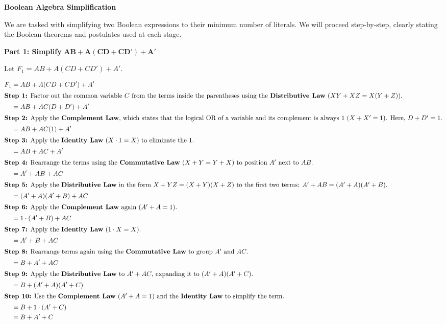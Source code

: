 \documentclass[12pt,a3paper]{article}
\begin{document}
\begin{enumerate}
\begin{tcolorbox}[enhanced,breakable,ansbox,colback=cA!4,colframe=cA,boxrule=0.8pt,arc=5pt,title={\textbf{Answer}},fonttitle=\bfseries\color{white},colbacktitle=cA]

\textbf{Boolean Algebra Simplification}

We are tasked with simplifying two Boolean expressions to their minimum number of literals. We will proceed step-by-step, clearly stating the Boolean theorems and postulates used at each stage.

\vspace{0.4cm}
\textbf{Part 1: Simplify } $\mathbf{AB + A(CD + CD') + A'}$

Let $F_1 = AB + A(CD + CD') + A'$. 

\begin{align*}
F_1 &= AB + A(CD + CD') + A' \\
\intertext{\textbf{Step 1:} Factor out the common variable $C$ from the terms inside the parentheses using the \textbf{Distributive Law} ($XY + XZ = X(Y + Z)$).}
&= AB + AC(D + D') + A' \\
\intertext{\textbf{Step 2:} Apply the \textbf{Complement Law}, which states that the logical OR of a variable and its complement is always $1$ ($X + X' = 1$). Here, $D + D' = 1$.}
&= AB + AC(1) + A' \\
\intertext{\textbf{Step 3:} Apply the \textbf{Identity Law} ($X \cdot 1 = X$) to eliminate the $1$.}
&= AB + AC + A' \\
\intertext{\textbf{Step 4:} Rearrange the terms using the \textbf{Commutative Law} ($X + Y = Y + X$) to position $A'$ next to $AB$.}
&= A' + AB + AC \\
\intertext{\textbf{Step 5:} Apply the \textbf{Distributive Law} in the form $X + YZ = (X + Y)(X + Z)$ to the first two terms: $A' + AB = (A' + A)(A' + B)$.}
&= (A' + A)(A' + B) + AC \\
\intertext{\textbf{Step 6:} Apply the \textbf{Complement Law} again ($A' + A = 1$).}
&= 1 \cdot (A' + B) + AC \\
\intertext{\textbf{Step 7:} Apply the \textbf{Identity Law} ($1 \cdot X = X$).}
&= A' + B + AC \\
\intertext{\textbf{Step 8:} Rearrange terms again using the \textbf{Commutative Law} to group $A'$ and $AC$.}
&= B + A' + AC \\
\intertext{\textbf{Step 9:} Apply the \textbf{Distributive Law} to $A' + AC$, expanding it to $(A' + A)(A' + C)$.}
&= B + (A' + A)(A' + C) \\
\intertext{\textbf{Step 10:} Use the \textbf{Complement Law} ($A' + A = 1$) and the \textbf{Identity Law} to simplify the term.}
&= B + 1 \cdot (A' + C) \\
&= B + A' + C
\end{align*}


\end{tcolorbox}
\end{enumerate}
\end{document}
